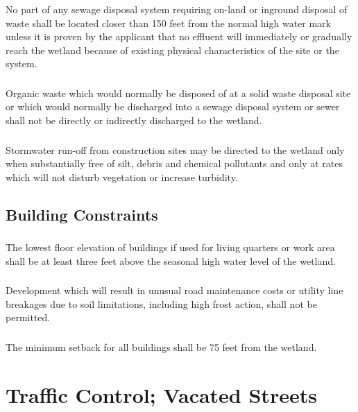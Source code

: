 \subsubsection{}
No part of any sewage disposal system requiring on-land or inground disposal of waste shall be located closer than 150 feet from the normal high water mark unless it is proven by the applicant that no effluent will immediately or gradually reach the wetland because of existing physical characteristics of the site or the system.
\subsubsection{}
Organic waste which would normally be disposed of at a solid waste disposal site or which would normally be discharged into a sewage disposal system or sewer shall not be directly or indirectly discharged to the wetland.
\subsubsection{}
Stormwater run-off from construction sites may be directed to the wetland only when substantially free of silt, debris and chemical pollutants and only at rates which will not disturb vegetation or increase turbidity.
\subsection{Building Constraints}
\subsubsection{}
The lowest floor elevation of buildings if used for living quarters or work area shall be at least three feet above the seasonal high water level of the wetland.
\subsubsection{}
Development which will result in unusual road maintenance costs or utility line breakages due to soil limitations, including high frost action, shall not be permitted.
\subsubsection{}
The minimum setback for all buildings shall be 75 feet from the wetland.

\section{Traffic Control; Vacated Streets}
